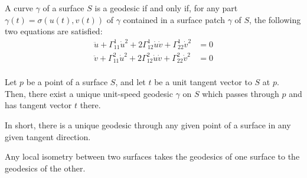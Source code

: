 \begin{proposition}
  A curve $\gamma$ of a surface $S$ is a geodesic if and only if,
  for any part $\gamma(t) = \sigma(u(t), v(t))$ of $\gamma$ contained
  in a surface patch $\gamma$ of $S$, the following two equations are satisfied:
  \begin{align*}
    \ddot{u} + \Gamma_{11}^1 \dot{u}^2 + 2 \Gamma_{12}^1 \dot{u}\dot{v} + \Gamma_{22}^1 \dot{v}^2 &= 0\\
    \ddot{v} + \Gamma_{11}^2 \dot{u}^2 + 2 \Gamma_{12}^2 \dot{u}\dot{v} + \Gamma_{22}^2 \dot{v}^2 &= 0\\
  \end{align*}
\end{proposition}

\begin{proposition}
  Let $p$ be a point of a surface $S$, and let $t$ be a unit tangent vector
  to $S$ at $p$. Then, there exist a unique unit-speed geodesic $\gamma$ on $S$ which
  passes through $p$ and has tangent vector $t$ there.
\end{proposition}

In short, there is a unique geodesic through any given point of a surface in any given tangent direction.

\begin{corollary}
  Any local isometry between two surfaces takes the geodesics of one surface to the geodesics of the other.
\end{corollary}